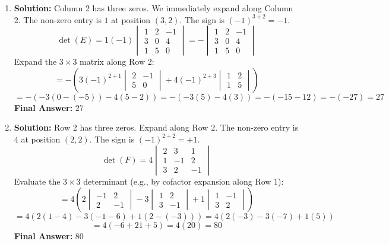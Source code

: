 \documentclass[11pt]{article}
\begin{document}
\begin{enumerate}
    \item \textbf{Solution:} Column 2 has three zeros. We immediately expand along Column 2. The non-zero entry is $1$ at position $(3,2)$. The sign is $(-1)^{3+2} = -1$.
    \[ \det(E) = 1(-1) \begin{vmatrix} 1 & 2 & -1 \\ 3 & 0 & 4 \\ 1 & 5 & 0 \end{vmatrix} = - \begin{vmatrix} 1 & 2 & -1 \\ 3 & 0 & 4 \\ 1 & 5 & 0 \end{vmatrix} \]
    Expand the $3 \times 3$ matrix along Row 2:
    \[ = - \left( 3(-1)^{2+1} \begin{vmatrix} 2 & -1 \\ 5 & 0 \end{vmatrix} + 4(-1)^{2+3} \begin{vmatrix} 1 & 2 \\ 1 & 5 \end{vmatrix} \right) \]
    \[ = - \left( -3(0 - (-5)) - 4(5 - 2) \right) = - \left( -3(5) - 4(3) \right) = -(-15 - 12) = -(-27) = 27 \]
    \textbf{Final Answer:} $27$

    \item \textbf{Solution:} Row 2 has three zeros. Expand along Row 2. The non-zero entry is $4$ at position $(2,2)$. The sign is $(-1)^{2+2} = +1$.
    \[ \det(F) = 4 \begin{vmatrix} 2 & 3 & 1 \\ 1 & -1 & 2 \\ 3 & 2 & -1 \end{vmatrix} \]
    Evaluate the $3 \times 3$ determinant (e.g., by cofactor expansion along Row 1):
    \[ = 4 \left( 2 \begin{vmatrix} -1 & 2 \\ 2 & -1 \end{vmatrix} - 3 \begin{vmatrix} 1 & 2 \\ 3 & -1 \end{vmatrix} + 1 \begin{vmatrix} 1 & -1 \\ 3 & 2 \end{vmatrix} \right) \]
    \[ = 4 \left( 2(1 - 4) - 3(-1 - 6) + 1(2 - (-3)) \right) = 4 \left( 2(-3) - 3(-7) + 1(5) \right) \]
    \[ = 4(-6 + 21 + 5) = 4(20) = 80 \]
    \textbf{Final Answer:} $80$


\end{enumerate}
\end{document}
